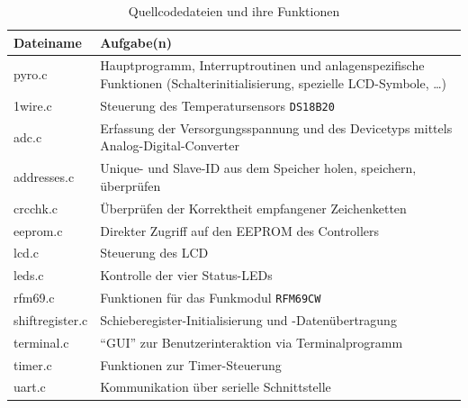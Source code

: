 \documentclass[paper=a4, parskip, numbers=noenddot, toc=listof, headsepline]{scrbook}
\begin{document}
			\begin{table}[h]
				\centering
				\begin{tabular}{lp{125mm}}
					\hline\hline \textbf{Dateiname} & \textbf{Aufgabe(n)}                                                                                                        \\ \hline
					pyro.c                          & Hauptprogramm, Interruptroutinen und anlagenspezifische Funktionen (Schalterinitialisierung, spezielle LCD-Symbole, \dots) \\
					1wire.c                         & Steuerung des Temperatursensors \texttt{DS18B20}                                                                           \\
					adc.c                           & Erfassung der Versorgungsspannung und des Devicetyps mittels Analog-Digital-Converter                                      \\
					addresses.c                     & Unique- und Slave-ID aus dem Speicher holen, speichern, überprüfen                                                         \\
					crcchk.c                        & Überprüfen der Korrektheit empfangener Zeichenketten                                                                       \\
					eeprom.c                        & Direkter Zugriff auf den EEPROM des Controllers                                                                            \\
					lcd.c                           & Steuerung des LCD                                                                                                          \\
					leds.c                          & Kontrolle der vier Status-LEDs                                                                                             \\
					rfm69.c                         & Funktionen für das Funkmodul \texttt{RFM69CW}                                                                              \\
					shiftregister.c                 & Schieberegister-Initialisierung und -Datenübertragung                                                                      \\
					terminal.c                      & \enquote{GUI} zur Benutzerinteraktion via Terminalprogramm                                                                 \\
					timer.c                         & Funktionen zur Timer-Steuerung                                                                                             \\
					uart.c                          & Kommunikation über serielle Schnittstelle                                                                                  \\ \hline\hline
				\end{tabular}
				\caption{Quellcodedateien und ihre Funktionen}
				\label{tab:sourcefiles}
			\end{table}
\end{document}
